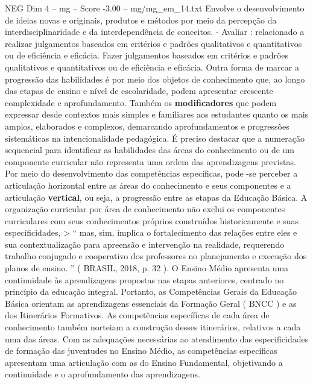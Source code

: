 \begin{textsample}{NEG Dim 4 – mg – Score -3.00 – mg/mg\_em\_14.txt}
Envolve o desenvolvimento de ideias novas e originais, produtos e métodos por meio da percepção da interdisciplinaridade e da interdependência de conceitos. - Avaliar : relacionado a realizar julgamentos baseados em critérios e padrões qualitativos e quantitativos ou de eficiência e eficácia.
Fazer julgamentos baseados em critérios e padrões qualitativos e quantitativos ou de eficiência e eficácia.
Outra forma de marcar a progressão das habilidades é por meio dos objetos de conhecimento que, ao longo das etapas de ensino e nível de escolaridade, podem apresentar crescente complexidade e aprofundamento.
Também os \textbf{modificadores} que podem expressar desde contextos mais simples e familiares aos estudantes quanto os mais amplos, elaborados e complexos, demarcando aprofundamentos e progressões sistemáticas na intencionalidade pedagógica.
É preciso destacar que a numeração sequencial para identificar as habilidades das áreas do conhecimento ou de um componente curricular não representa uma ordem das aprendizagens previstas.
Por meio do desenvolvimento das competências específicas, pode -se perceber a articulação horizontal entre as áreas do conhecimento e seus componentes e a articulação \textbf{vertical}, ou seja, a progressão entre as etapas da Educação Básica.
A organização curricular por área de conhecimento não exclui os componentes curriculares com seus conhecimentos próprios construídos historicamente e suas especificidades, > “ mas, sim, implica o fortalecimento das relações entre eles e sua contextualização para apreensão e intervenção na realidade, requerendo trabalho conjugado e cooperativo dos professores no planejamento e execução dos planos de ensino. ” ( BRASIL, 2018, p. 32 ).
O Ensino Médio apresenta uma continuidade às aprendizagens propostas nas etapas anteriores, centrado no princípio da educação integral.
Portanto, as Competências Gerais da Educação Básica orientam as aprendizagens essenciais da Formação Geral ( BNCC ) e as dos Itinerários Formativos.
As competências específicas de cada área de conhecimento também norteiam a construção desses itinerários, relativos a cada uma das áreas.
Com as adequações necessárias ao atendimento das especificidades de formação das juventudes no Ensino Médio, as competências específicas apresentam uma articulação com as do Ensino Fundamental, objetivando a continuidade e o aprofundamento das aprendizagens.

\end{textsample}
